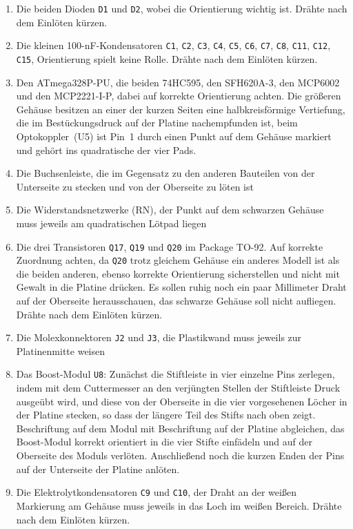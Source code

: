 \documentclass[paper=a4, open=any]{scrbook}
\begin{document}
\begin{enumerate}
					\item Die beiden Dioden \texttt{D1} und \texttt{D2}, wobei die Orientierung wichtig ist. Drähte nach dem Einlöten kürzen.
					\item Die kleinen 100-nF-Kondensatoren \texttt{C1}, \texttt{C2}, \texttt{C3}, \texttt{C4}, \texttt{C5}, \texttt{C6}, \texttt{C7}, \texttt{C8}, \texttt{C11}, \texttt{C12}, \texttt{C15}, Orientierung spielt keine Rolle. Drähte nach dem Einlöten kürzen.
					\item Den ATmega328P-PU, die beiden 74HC595, den SFH620A-3, den MCP6002 und den MCP2221-I-P, dabei auf korrekte Orientierung achten. Die größeren Gehäuse besitzen an einer der kurzen Seiten eine halbkreisförmige Vertiefung, die im Bestückungsdruck auf der Platine nachempfunden ist, beim Optokoppler~(U5) ist Pin~1 durch einen Punkt auf dem Gehäuse markiert und gehört ins quadratische der vier Pads.
					\item Die Buchsenleiste, die im Gegensatz zu den anderen Bauteilen von der Unterseite zu stecken und von der Oberseite zu löten ist
					\item Die Widerstandsnetzwerke (RN), der Punkt auf dem schwarzen Gehäuse muss jeweils am quadratischen Lötpad liegen
					\item Die drei Transistoren \texttt{Q17}, \texttt{Q19} und \texttt{Q20} im Package TO-92. Auf korrekte Zuordnung achten, da \texttt{Q20} trotz gleichem Gehäuse ein anderes Modell ist als die beiden anderen, ebenso korrekte Orientierung sicherstellen und nicht mit Gewalt in die Platine drücken. Es sollen ruhig noch ein paar Millimeter Draht auf der Oberseite herausschauen, das schwarze Gehäuse soll nicht aufliegen. Drähte nach dem Einlöten kürzen.
					\item Die Molexkonnektoren \texttt{J2} und \texttt{J3}, die Plastikwand muss jeweils zur Platinenmitte weisen
					\item Das Boost-Modul \texttt{U8}: Zunächst die Stiftleiste in vier einzelne Pins zerlegen, indem mit dem Cuttermesser an den verjüngten Stellen der Stiftleiste Druck ausgeübt wird, und diese von der Oberseite in die vier vorgesehenen Löcher in der Platine stecken, so dass der längere Teil des Stifts nach oben zeigt. Beschriftung auf dem Modul mit Beschriftung auf der Platine abgleichen, das Boost-Modul korrekt orientiert in die vier Stifte einfädeln und auf der Oberseite des Moduls verlöten. Anschließend noch die kurzen Enden der Pins auf der Unterseite der Platine anlöten.
					\item Die Elektrolytkondensatoren \texttt{C9} und \texttt{C10}, der Draht an der weißen Markierung am Gehäuse muss jeweils in das Loch im weißen Bereich.  Drähte nach dem Einlöten kürzen.

\end{enumerate}
\end{document}
